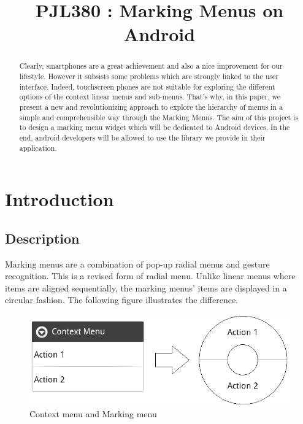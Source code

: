\documentclass[conference]{IEEEtran}
\begin{document}
\title{PJL380 : Marking Menus on Android}

\author{
\and
{}
}

\maketitle

\IEEEpeerreviewmaketitle

\begin{abstract}
Clearly, smartphones are a great achievement and also a nice improvement for our lifestyle. However it subsists some problems which are strongly linked to the user interface. Indeed, touchscreen phones are not suitable for exploring the different options of the context linear menus and sub-menus. That's why, in this paper, we present a new and revolutionizing approach to explore the hierarchy of menus in a simple and comprehensible way through the Marking Menus. The aim of this project is to design a marking menu widget which will be dedicated to Android devices. In the end, android developers will be allowed to use the library we provide in their application. 
\end{abstract}

\section{Introduction}
\subsection{Description}
Marking menus \cite{markingmenu} are a combination of pop-up radial menus and gesture recognition. This is a revised form of radial menu. Unlike linear menus where items are aligned sequentially, the marking menus' items are displayed in a circular fashion. The following figure illustrates the difference. 

\begin{figure}[!ht] 
		\centering
		\includegraphics[scale = 0.5]{figure1.png} %
		\caption{Context menu and Marking menu}
		\label{linear-marking_menus}
\end{figure}
\end{document}
